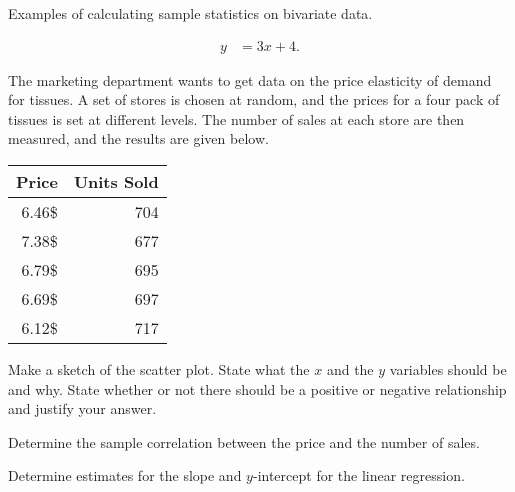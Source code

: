 



\begin{problem}
\item Examples of calculating sample statistics on bivariate data.

  \begin{subproblem}
  \item 
    \begin{eqnarray}
      y & = 3x + 4.
    \end{eqnarray}
    \vfill
  \end{subproblem}


\end{problem}


\begin{problem}
  \item The marketing department wants to get data on the price
    elasticity of demand for tissues. A set of stores is chosen at
    random, and the prices for a four pack of tissues is set at
    different levels. The number of sales at each store are then
    measured, and the results are given below. \\
    \begin{tabular}{r|r}
      Price & Units Sold \\ \hline
      6.46\$ & 704 \\
      7.38\$ & 677 \\
      6.79\$ & 695 \\
      6.69\$ & 697 \\
      6.12\$ & 717
    \end{tabular}

    \begin{subproblem}
    \item Make a sketch of the scatter plot. State what the $x$ and
      the $y$ variables should be and why. State whether or not there
      should be a positive or negative relationship and justify your
      answer.

      \vfill

    \item Determine the sample correlation between the price and the
      number of sales.

      \vfill

    \item Determine estimates for the slope and $y$-intercept for the
      linear regression.


\end{subproblem}
\end{problem}
